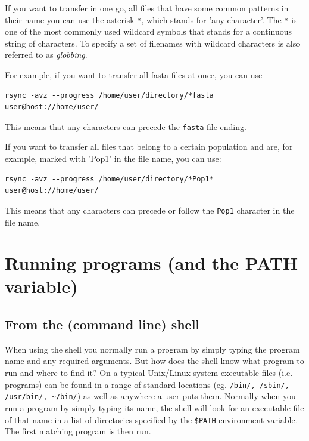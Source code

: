 \documentclass[11pt]{article}
\begin{document}
If you want to transfer in one go, all files that have some common
patterns in their name you can use the asterisk \texttt{*}, which
stands for 'any character'. The \texttt{*} is one of the most commonly used
wildcard symbols that stands for a continuous string of characters. To
specify a set of filenames with wildcard characters is also referred
to as \emph{globbing}.

For example, if you want to transfer all
fasta files at once, you can use

\begin{verbatim}
rsync -avz --progress /home/user/directory/*fasta user@host://home/user/
\end{verbatim}
This means that any characters can precede the \texttt{fasta} file ending.



If you want to transfer all files that belong to a certain population
and are, for example, marked with 'Pop1' in the file name, you can use:

\begin{verbatim}
rsync -avz --progress /home/user/directory/*Pop1* user@host://home/user/
\end{verbatim}
This means that any characters can precede or follow the \texttt{Pop1}
character in the file name.

\section{Running programs (and the PATH variable)}
\label{sec:orgheadline19}
\subsection{From the (command line) shell}
\label{sec:orgheadline16}
When using the shell you normally run a program by simply typing the
program name and any required arguments. But how does the shell know
what program to run and where to find it? On a typical Unix/Linux
system executable files (i.e. programs) can be found in a range of
standard locations (eg. \texttt{/bin/, /sbin/, /usr/bin/, \textasciitilde{}/bin/}) as well as
anywhere a user puts them. Normally when you run a program by simply
typing its name, the shell will look for an executable file of that name
in a list of directories specified by the \texttt{\$PATH} environment variable.
The first matching program is then run.
\end{document}
